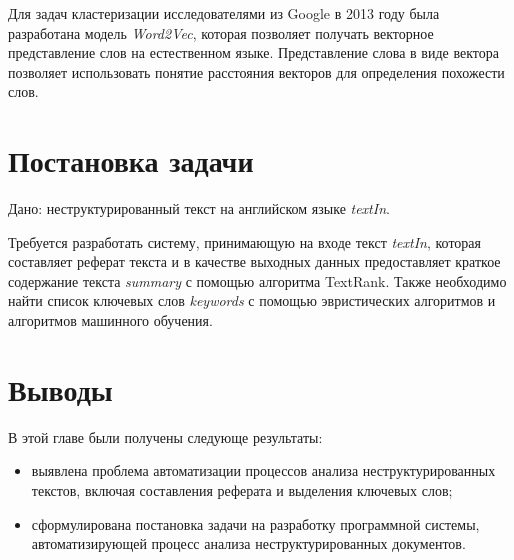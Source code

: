 Для задач кластеризации исследователями из Google в 2013 году была разработана модель \textit{Word2Vec}, которая позволяет получать векторное представление слов на естественном языке. Представление слова в виде вектора позволяет использовать понятие расстояния векторов для определения похожести слов.

\section{Постановка задачи}

Дано: неструктурированный текст на английском языке \textit{textIn}.

Требуется разработать систему, принимающую на входе текст \textit{textIn}, которая составляет реферат текста и в качестве выходных данных предоставляет краткое содержание текста \textit{summary} с помощью алгоритма TextRank. Также необходимо найти список ключевых слов \textit{keywords} с помощью эвристических алгоритмов и алгоритмов машинного обучения.

\section{Выводы}

В этой главе были получены следующе результаты:
\begin{itemize}
    \item выявлена проблема автоматизации процессов анализа неструктурированных текстов, включая составления реферата и выделения ключевых слов;
    \item сформулирована постановка задачи на разработку программной системы, автоматизирующей процесс анализа неструктурированных документов.
\end{itemize}
\newpage
